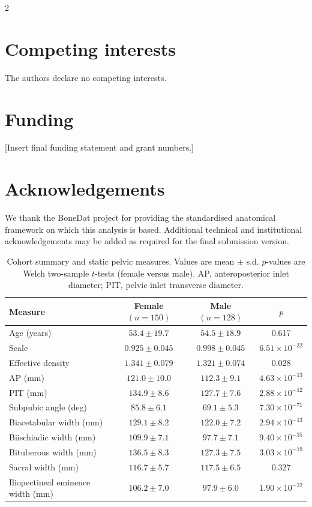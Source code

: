 \documentclass[openacc]{rsproca_new}
\begin{document}
\begin{multicols}{2}
\section*{Competing interests}

The authors declare no competing interests.

\section*{Funding}

[Insert final funding statement and grant numbers.]

\section*{Acknowledgements}

We thank the BoneDat project for providing the standardised anatomical framework on which this analysis is based. Additional technical and institutional acknowledgements may be added as required for the final submission version.

\end{multicols}

\begin{table}[p]
\centering
\caption{Cohort summary and static pelvic measures. Values are mean $\pm$ s.d. $p$-values are Welch two-sample $t$-tests (female versus male). AP, anteroposterior inlet diameter; PIT, pelvic inlet transverse diameter.}
\label{tab:cohort}
\begin{tabular}{lccc}
\toprule
Measure & Female $(n=150)$ & Male $(n=128)$ & $p$ \\
\midrule
Age (years) & $53.4 \pm 19.7$ & $54.5 \pm 18.9$ & 0.617 \\
Scale & $0.925 \pm 0.045$ & $0.998 \pm 0.045$ & $6.51 \times 10^{-32}$ \\
Effective density & $1.341 \pm 0.079$ & $1.321 \pm 0.074$ & 0.028 \\
AP (mm) & $121.0 \pm 10.0$ & $112.3 \pm 9.1$ & $4.63 \times 10^{-13}$ \\
PIT (mm) & $134.9 \pm 8.6$ & $127.7 \pm 7.6$ & $2.88 \times 10^{-12}$ \\
Subpubic angle (deg) & $85.8 \pm 6.1$ & $69.1 \pm 5.3$ & $7.30 \times 10^{-71}$ \\
Biacetabular width (mm) & $129.1 \pm 8.2$ & $122.0 \pm 7.2$ & $2.94 \times 10^{-13}$ \\
Biischiadic width (mm) & $109.9 \pm 7.1$ & $97.7 \pm 7.1$ & $9.40 \times 10^{-35}$ \\
Bituberous width (mm) & $136.5 \pm 8.3$ & $127.3 \pm 7.5$ & $3.03 \times 10^{-19}$ \\
Sacral width (mm) & $116.7 \pm 5.7$ & $117.5 \pm 6.5$ & 0.327 \\
Iliopectineal eminence width (mm) & $106.2 \pm 7.0$ & $97.9 \pm 6.0$ & $1.90 \times 10^{-22}$ \\
\bottomrule
\end{tabular}
\end{table}
\end{document}
